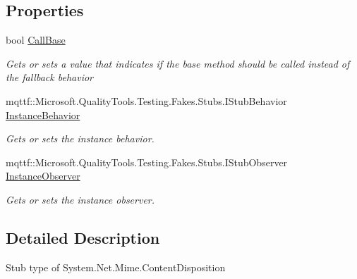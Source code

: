 \subsection*{Properties}
\begin{DoxyCompactItemize}
\item 
bool \hyperlink{class_system_1_1_net_1_1_mime_1_1_fakes_1_1_stub_content_disposition_af8f3333b242887cb5b2ac461f4f6b25b}{Call\-Base}
\begin{DoxyCompactList}\small\item\em Gets or sets a value that indicates if the base method should be called instead of the fallback behavior\end{DoxyCompactList}\item 
mqttf\-::\-Microsoft.\-Quality\-Tools.\-Testing.\-Fakes.\-Stubs.\-I\-Stub\-Behavior \hyperlink{class_system_1_1_net_1_1_mime_1_1_fakes_1_1_stub_content_disposition_a9e26496a00dabbc0d6ddb45c1bd305c2}{Instance\-Behavior}
\begin{DoxyCompactList}\small\item\em Gets or sets the instance behavior.\end{DoxyCompactList}\item 
mqttf\-::\-Microsoft.\-Quality\-Tools.\-Testing.\-Fakes.\-Stubs.\-I\-Stub\-Observer \hyperlink{class_system_1_1_net_1_1_mime_1_1_fakes_1_1_stub_content_disposition_a88d873e5fbd6b61ea4f50b87622a94ee}{Instance\-Observer}
\begin{DoxyCompactList}\small\item\em Gets or sets the instance observer.\end{DoxyCompactList}\end{DoxyCompactItemize}


\subsection{Detailed Description}
Stub type of System.\-Net.\-Mime.\-Content\-Disposition



